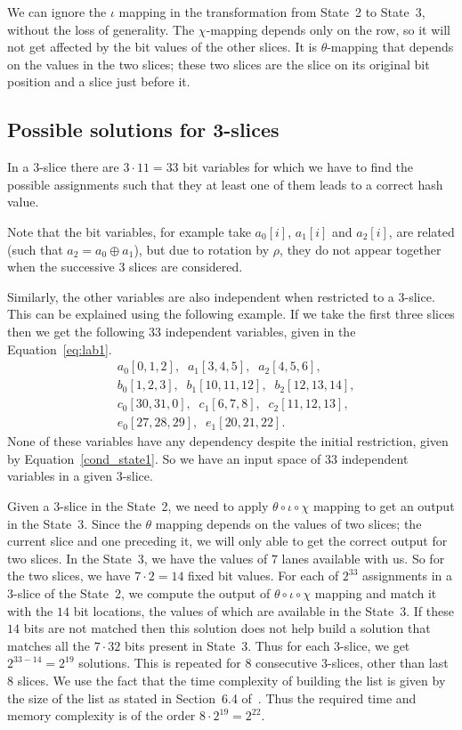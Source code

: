 We can ignore the $\iota$ mapping in the transformation from State~2 to State~3, without the loss of generality. The $\chi$-mapping depends only on the row, so it will not get affected by the bit values of the other slices. It is $\theta$-mapping that depends on the values in the two slices; these two slices are the slice on its original bit position and a slice just before it.

\subsection{Possible solutions for 3-slices} 
In a $3$-slice there are $3 \cdot 11 = 33$ bit variables for which we have to find the possible assignments such that they at least one of them leads to a correct hash value. 

Note that the bit variables, for example take $a_0[i]$, $a_1[i]$ and $a_2[i]$, are related (such that $a_2 = a_0 \oplus a_1$), but due to rotation by $\rho$, they do not appear together when the successive $3$ slices are considered.

Similarly, the other variables are also independent when restricted to a $3$-slice.
This can be explained using the following example. If we take the first three slices then we get the following $33$ independent variables, given in the Equation~\ref{eq:lab1}.
\begin{equation}
\label{eq:lab1}
\begin{aligned}
&a_0[0,1,2],\;\;a_1[3,4,5],\;\;a_2[4,5,6],\\
&b_0[1,2,3],\;\; b_1[10,11,12],\;\;b_2[12,13,14],\\
&c_0[30,31,0],\;\;c_1[6,7,8],\;\;c_2[11,12,13],\\
&e_0[27,28,29],\;\; e_1[20,21,22].
\end{aligned}
\end{equation}
None of these variables have any dependency despite the initial restriction, given by Equation~\ref{cond_state1}. So we have an input space of $33$ independent variables in a given $3$-slice. 

Given a $3$-slice in the State~2, we need to apply $\theta \circ \iota \circ \chi$ mapping to get an output in the State~3. Since the $\theta$ mapping depends on the values of two slices; the current slice and one preceding it, we will only able to get the correct output for two slices. In the State~3, we have the values of $7$ lanes available with us. So for the two slices, we have $7\cdot 2 = 14$ fixed bit values.
For each of $2^{33}$ assignments in a $3$-slice of the State~2, we compute the output of $\theta \circ \iota \circ \chi$ mapping and match it with the $14$ bit locations, the values of which are available in the State~3. If these $14$ bits are not matched then this solution does not help build a solution that matches all the $7 \cdot 32$ bits present in State~3.
Thus for each $3$-slice, we get $2^{33-14} = 2^{19}$ solutions. This is repeated for $8$ consecutive $3$-slices, other than last $8$ slices. We use the fact that the time complexity of building the list is given by the size of the list as stated in Section~6.4 of~\cite{naya2011practical}. Thus the required time and memory complexity is of the order $8 \cdot 2^{19} = 2^{22}$.

